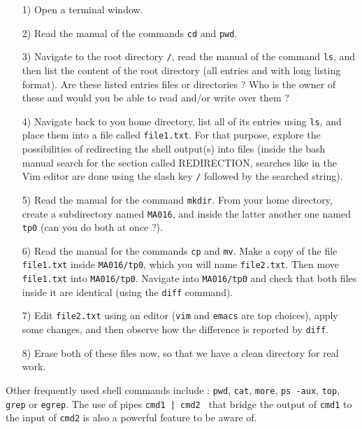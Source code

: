 \documentclass[a4paper,12pt]{article}
\begin{document}
 
\begin{itemize}

\item[1)] Open a terminal window.

\item[2)] Read the manual of the commands \texttt{cd} and \texttt{pwd}. 

\item[3)] Navigate to the root directory \texttt{/}, read the manual of the command \texttt{ls}, and then list the content of the root directory (all entries and with long listing format). Are these listed entries files or directories ? Who is the owner of these and would you be able to read and/or write over them ?

\item[4)] Navigate back to you home directory, list all of its entries using {\tt ls}, and place them into a file called {\tt file1.txt}. For that purpose, explore the possibilities of redirecting the shell output(s) into files (inside the bash manual search for the section called REDIRECTION, searches like in the Vim editor are done using the slash key {\tt /} followed by the searched string).

\item[5)] Read the manual for the command {\tt mkdir}. From your home directory, create a subdirectory named {\tt MA016}, and inside the latter another one named {\tt tp0} (can you do both at once ?).

\item[6)] Read the manual for the commands {\tt cp} and {\tt mv}. Make a copy of the file {\tt file1.txt} inside {\tt MA016/tp0}, which you will name {\tt file2.txt}. Then move {\tt file1.txt} into {\tt MA016/tp0}. Navigate into {\tt MA016/tp0} and check that both files inside it are identical (using the {\tt diff} command).   

\item[7)] Edit {\tt file2.txt} using an editor ({\tt vim} and {\tt emacs} are top choices), apply some changes, and then observe how the difference is reported by {\tt diff}.

\item[8)] Erase both of these files now, so that we have a clean directory for real work. 

\end{itemize}

\noindent Other frequently used shell commands include : {\tt pwd}, {\tt cat}, {\tt more}, {\tt ps -aux}, {\tt top}, {\tt grep} or {\tt egrep}. The use of pipes {\tt cmd1 | cmd2 } that bridge the output of {\tt cmd1} to the input of {\tt cmd2} is also a powerful feature to be aware of. 
\end{document}
